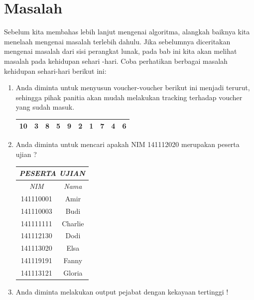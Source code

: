 \section{Masalah}
Sebelum kita membahas lebih lanjut mengenai algoritma, alangkah baiknya kita menelaah mengenai masalah terlebih dahulu. Jika sebelumnya diceritakan mengenai masalah dari sisi perangkat lunak, pada bab ini kita akan melihat masalah pada kehidupan sehari -hari. Coba perhatikan berbagai masalah kehidupan sehari-hari berikut ini:

\begin{enumerate}
	\item Anda diminta untuk menyusun voucher-voucher berikut ini menjadi terurut, sehingga pihak panitia akan mudah melakukan tracking terhadap voucher yang sudah masuk.  
	
	
\begin{center} \Large
  \begin{tabular}[h!]{| c | c | c | c | c | c | c | c | c | c | }
	\hline
    10 & 3 & 8 & 5 & 9 & 2 & 1 &  7 & 4 & 6 \\
	\hline
  \end{tabular}
\end{center}


	\item Anda diminta untuk mencari apakah NIM 141112020 merupakan peserta ujian ? 
		\newpage \Large
			\begin{center}
				\begin{tabular}[h!]{| c | c |}
				\hline
				\multicolumn{2}{|c|}{\textit{PESERTA UJIAN}} \\
				\hline	
				\textit{NIM} & \textit{Nama} \\ \hline
				141110001 & Amir \\ \hline
				141110003 & Budi \\ \hline
				141111111 & Charlie \\ \hline
				141112130 & Dodi \\ \hline
				141113020 & Elsa \\ \hline
				141119191 & Fanny \\ \hline
				141113121 & Gloria \\ 
				\hline
				\end{tabular}
		\end{center}
		
	\item Anda diminta melakukan output pejabat dengan kekayaan tertinggi !
	

\end{enumerate}
